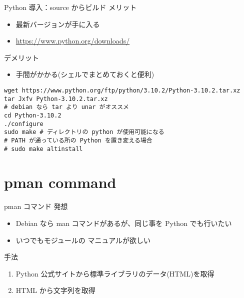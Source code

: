 \documentclass[compress,dvipdfmx,11pt]{beamer}
\begin{document}
\begin{frame}[label={sec:orge063980},fragile]{Python 導入：source からビルド}
 メリット
\begin{itemize}
\item 最新バージョンが手に入る
\item \url{https://www.python.org/downloads/}
\end{itemize}

デメリット
\begin{itemize}
\item 手間がかかる(シェルでまとめておくと便利)
\end{itemize}
\begin{verbatim}
wget https://www.python.org/ftp/python/3.10.2/Python-3.10.2.tar.xz
tar Jxfv Python-3.10.2.tar.xz
# debian なら tar より unar がオススメ
cd Python-3.10.2
./configure
sudo make # ディレクトリの python が使用可能になる
# PATH が通っている所の Python を置き変える場合
# sudo make altinstall
\end{verbatim}
\end{frame}



\section{pman command}
\label{sec:org0a69fd0}
\begin{frame}[label={sec:orgb34639e}]{pman コマンド}
発想
\begin{itemize}
\item Debian なら man コマンドがあるが、同じ事を Python でも行いたい
\item いつでもモジュールの \alert{マニュアルが欲しい}
\end{itemize}

手法
\begin{enumerate}
\item Python 公式サイトから標準ライブラリのデータ(HTML)を取得
\item HTML から文字列を取得
\end{enumerate}
\end{frame}
\end{document}
